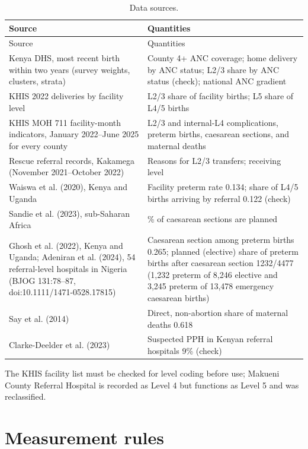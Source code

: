 \documentclass[11pt]{article}
\begin{document}
\begin{longtable}{>{\raggedright\arraybackslash}p{} >{\raggedright\arraybackslash}p{}}
\caption{Data sources.}\label{tab:sources}\\
\toprule
Source & Quantities \\
\midrule
\endfirsthead
\toprule
Source & Quantities \\
\midrule
\endhead
2022 Kenya DHS, most recent birth within two years (survey weights, clusters, strata) & County 4+ ANC coverage; home delivery by ANC status; L2/3 share by ANC status (check); national ANC gradient \\
KHIS 2022 deliveries by facility level & L2/3 share of facility births; L5 share of L4/5 births \\
KHIS MOH 711 facility-month indicators, January 2022--June 2025 for every county & L2/3 and internal-L4 complications, preterm births, caesarean sections, and maternal deaths \\
Rescue referral records, Kakamega (November 2021--October 2022) & Reasons for L2/3 transfers; receiving level \\
Waiswa et al. (2020), Kenya and Uganda & Facility preterm rate 0.134; share of L4/5 births arriving by referral 0.122 (check) \\
Sandie et al. (2023), sub-Saharan Africa & 40\% of caesarean sections are planned \\
Ghosh et al. (2022), Kenya and Uganda; Adeniran et al. (2024), 54 referral-level hospitals in Nigeria (BJOG 131:78--87, doi:10.1111/1471-0528.17815) & Caesarean section among preterm births 0.265; planned (elective) share of preterm births after caesarean section 1232/4477 (1,232 preterm of 8,246 elective and 3,245 preterm of 13,478 emergency caesarean births) \\
Say et al. (2014) & Direct, non-abortion share of maternal deaths 0.618 \\
Clarke-Deelder et al. (2023) & Suspected PPH in Kenyan referral hospitals 9\% (check) \\
\bottomrule
\end{longtable}

The KHIS facility list must be checked for level coding before use; Makueni
County Referral Hospital is recorded as Level 4 but functions as Level 5 and
was reclassified.

\section{Measurement rules}
\end{document}

